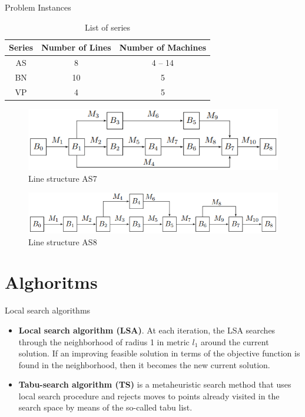\documentclass[aspectratio=169,xcolor=dvipsnames]{beamer}
\begin{document}

\begin{frame}{Problem Instances}
\begin{table}[!ht]
\centering
\small
\begin{tabular}{|c|c|c|}
\hline
 \textbf{Series}& \textbf{Number of Lines}& \textbf{Number of Machines}\\
\hline
AS & 8 & 4 -- 14 \\
BN & 10 & 5 \\
VP & 4 & 5 \\
\hline
\end{tabular}
\caption{List of series}\label{tabl:series}
\end{table}
\vspace{-0.2cm}	
 \begin{figure}[h!]
	\centering
	\includegraphics[scale=0.6]{ans7}
\vspace{-0.3cm}	
  \caption{Line structure AS7} \label{fig:vis_as7}
  \end{figure}
\vspace{-0.2cm}	
 \begin{figure}[h!]
	\centering
	\includegraphics[scale=0.55]{ans8}
	\vspace{-0.3cm}
  \caption{Line structure AS8} \label{fig:vis_as8}
  \end{figure}
\end{frame}

\section{Alghoritms}

\begin{frame}{Local search algorithms}
\begin{itemize}
\item \textbf{Local search algorithm (LSA)}. At each iteration, the LSA searches through the neighborhood of radius 1 in metric $l_1$ around
the current solution. If an improving feasible solution in terms of the  objective function is found in the neighborhood, then it becomes the new current solution.
\vspace{1cm}
\item \textbf{Tabu-search algorithm (TS)} is a metaheuristic search method  that uses local search procedure and rejects moves to points already visited in the search space by means of the so-called tabu list.
\end{itemize}
\end{frame}
\end{document}
